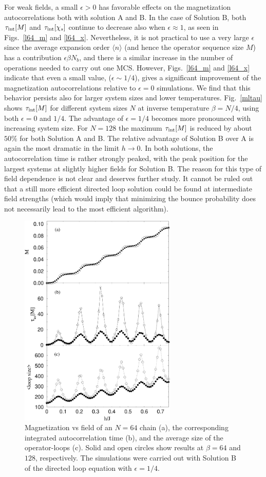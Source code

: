 \documentclass[10pt,pre,aps,twocolumn,showpacs,superscriptaddress,
floatfix]{revtex4}
\begin{document}
For weak fields, a small $\epsilon > 0$ has favorable effects on the 
magnetization autocorrelations both with solution A and B. In the case of
Solution B, both $\tau_{\rm int}[M]$ and $\tau_{\rm int}[\chi_s]$ continue 
to decrease also when $\epsilon \approx 1$, as seen in Figs.~\ref{l64_m} and 
\ref{l64_x}. Nevertheless, it is not practical to use a very large $\epsilon$ 
since the average expansion order $\langle n\rangle$ (and hence the operator 
sequence size $M$) has a contribution $\epsilon \beta N_b$, and there is
a similar increase in the number of operations needed to carry 
out one MCS. However, Figs.~\ref{l64_m} and \ref{l64_x} indicate that even 
a small value, ($\epsilon \sim 1/4$), gives a significant improvement 
of the magnetization autocorrelations relative to $\epsilon = 0$ simulations. 
We find that this behavior persists also for larger system sizes and lower 
temperatures. Fig.~\ref{mltau} shows $\tau_{\rm int}[M]$ for different 
system sizes $N$ at inverse temperature $\beta=N/4$, using both $\epsilon=0$ 
and $1/4$. The advantage of $\epsilon=1/4$ becomes more pronounced with 
increasing system size. For $N=128$ the maximum $\tau_{\rm int}[M]$ is reduced
by about $50\%$ for both Solution A and B. The relative advantage of 
Solution B over A is again the most dramatic in the limit $h \to 0$.
In both solutions, the autocorrelation time is rather strongly peaked, with
the peak position for the largest systems at slightly higher fields for
Solution B. The reason for this type of field dependence is not clear and 
deserves further study. It cannot be ruled out that a still more efficient 
directed loop solution could be found at intermediate field strengths (which 
would imply that minimizing the bounce probability does not necessarily 
lead to the most efficient algorithm). 

\begin{figure}
\includegraphics[clip,width=7.5cm]{fig17.eps}
\caption{Magnetization vs field of an $N=64$ chain (a), the corresponding 
integrated autocorrelation time (b), and the average size of the 
operator-loops (c). Solid and open circles show results at $\beta=64$ and 
$128$, respectively. The simulations were carried out with Solution B of 
the directed loop equation with $\epsilon=1/4$.}
\label{steps}
\end{figure}
\end{document}
